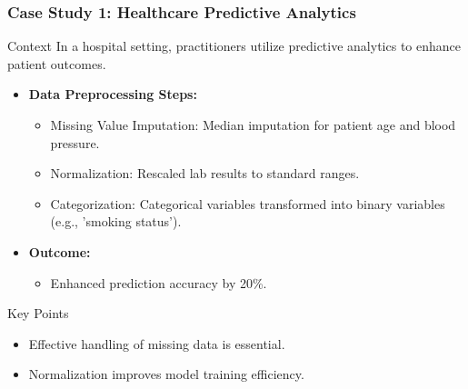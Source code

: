 \documentclass[aspectratio=169]{beamer}
\begin{document}
\begin{frame}[fragile]
    \frametitle{Case Study 1: Healthcare Predictive Analytics}
    \begin{block}{Context}
        In a hospital setting, practitioners utilize predictive analytics to enhance patient outcomes.
    \end{block}
    
    \begin{itemize}
        \item \textbf{Data Preprocessing Steps:}
        \begin{itemize}
            \item Missing Value Imputation: Median imputation for patient age and blood pressure.
            \item Normalization: Rescaled lab results to standard ranges.
            \item Categorization: Categorical variables transformed into binary variables (e.g., 'smoking status').
        \end{itemize}
        \item \textbf{Outcome:}
        \begin{itemize}
            \item Enhanced prediction accuracy by 20\%.
        \end{itemize}
    \end{itemize}
    
    \begin{block}{Key Points}
        \begin{itemize}
            \item Effective handling of missing data is essential.
            \item Normalization improves model training efficiency.
        \end{itemize}
    \end{block}
\end{frame}
\end{document}

